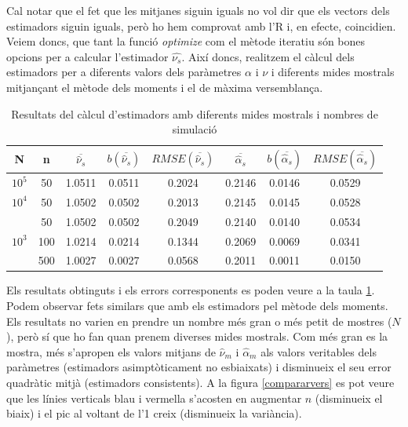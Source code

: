 \documentclass[12pt, catalan]{article}
\numberwithin{table}{section}
\numberwithin{figure}{section}
\numberwithin{equation}{section}
\begin{document}
Cal notar que el fet que les mitjanes siguin iguals no vol dir que els vectors dels estimadors siguin iguals, però ho hem comprovat amb l'R i, en efecte, coincidien. 
Veiem doncs, que tant la funció \emph{optimize} com el mètode iteratiu són bones opcions per a calcular l'estimador $\hat{\nu_s}$.
Així doncs, realitzem el càlcul dels estimadors per a diferents valors dels paràmetres $\alpha$ i $\nu$ i diferents mides mostrals mitjançant el mètode dels moments i el de màxima versemblança.
\begin{table}[h]
\centering
\caption{Resultats del càlcul d'estimadors amb diferents mides mostrals i nombres de simulació}\vspace{0.3cm}
\begin{tabular}{|c|c|c|c|c|c|c|c|}
\hline
N                    & n   & $\overline{\hat{\nu}_s}$& $b(\overline{\hat{\nu}_s})$ & $RMSE(\overline{\hat{\nu}_s})$  & $\overline{\hat{\alpha}_s}$    & $b(\overline{\hat{\alpha}_s})$ & $RMSE(\overline{\hat{\alpha}_s})$ \\ \hline
$10^5$                  & 50  & 1.0511 &0.0511& 0.2024  & 0.2146 &0.0146& 0.0529   \\ \hline
$10^4$                   & 50  & 1.0502 &0.0502& 0.2013  & 0.2145 &0.0145& 0.0528   \\ \hline
\multirow{3}{*}{$10^3$ } & 50  & 1.0502 &0.0502& 0.2049  & 0.2140 &0.0140& 0.0534   \\ \cline{2-8} 
                     & 100 & 1.0214 &0.0214& 0.1344  & 0.2069 &0.0069& 0.0341   \\ \cline{2-8} 
                     & 500 & 1.0027 &0.0027& 0.0568 & 0.2011 &0.0011& 0.0150   \\ \hline
\end{tabular}
\label{nusalphas}
\end{table}

Els resultats obtinguts i els errors corresponents es poden veure a la taula \ref{nusalphas}. Podem observar fets similars que amb els estimadors pel mètode dels moments. Els resultats no varien en prendre un nombre més gran o més petit de mostres ($N$), però sí que ho fan quan prenem diverses mides mostrals. Com més gran es la mostra, més s'apropen els valors mitjans de $\hat{\nu}_m$ i $\hat{\alpha}_m$ als valors veritables dels paràmetres (estimadors asimptòticament no esbiaixats) i disminueix el seu error quadràtic mitjà (estimadors consistents). A la figura \ref{compararvers} es pot veure que les línies verticals blau i vermella s'acosten en augmentar $n$ (disminueix el biaix) i el pic al voltant de l'1 creix (disminueix la variància).
\end{document}
